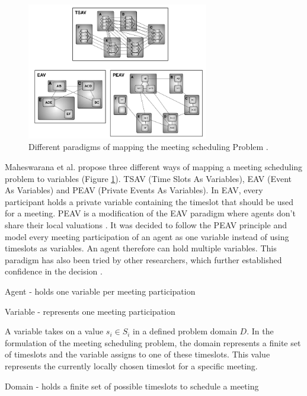 \begin{figure}[h!]
\includegraphics[width=300px]{graphics/variablemodell.png}
\caption{Different paradigms of mapping the meeting scheduling Problem \cite{Maheswarana}.}
\label{fig:variablemapping}
\end{figure}
Maheswarana et al. propose three different ways of mapping a meeting scheduling problem to variables (Figure \ref{fig:variablemapping}). TSAV (Time Slots As Variables), EAV (Event As Variables) and PEAV (Private Events As Variables). In EAV, every participant holds a private variable containing the timeslot that should be used for a meeting. PEAV is a modification of the EAV paradigm where agents don't share their local valuations \cite{Maheswarana,}. It was decided to follow the PEAV principle and model every meeting participation of an agent as one variable instead of using timeslots as variables. An agent therefore can hold multiple variables. This paradigm has also been tried by other researchers, which further established confidence in the decision \cite{Petcu2003}.
\begin{hardconstraint2}
Agent - holds one variable per meeting participation
\end{hardconstraint2}
\begin{hardconstraint2}
Variable - represents one meeting participation
\end{hardconstraint2}
A variable takes on a value \(s_{i} \in S_{i}\) in a defined problem domain \(D\). In the formulation of the meeting scheduling problem, the domain represents a finite set of timeslots and the variable assigns to one of these timeslots. This value represents the currently locally chosen timeslot for a specific meeting.
\begin{hardconstraint2}
Domain - holds a finite set of possible timeslots to schedule a meeting
\end{hardconstraint2}
